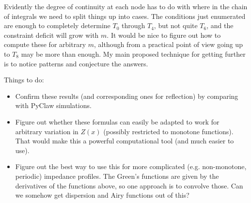 \documentclass[11pt]{article}
\begin{document}
Evidently the degree of continuity at each node has to do with where in the
chain of integrals we need to split things up into cases.
The conditions just enumerated are enough to completely determine $T_0$ through $T_4$,
but not quite $T_6$, and the constraint deficit will grow with $m$.  It would be nice
to figure out how to compute these for arbitrary $m$, although from a practical point
of view going up to $T_8$ may be more than enough.  My main proposed technique for
getting further is to notice patterns and conjecture the answers.

Things to do:
\begin{itemize}
    \item Confirm these results (and corresponding ones for reflection) by comparing with
            PyClaw simulations.
    \item Figure out whether these formulas can easily be adapted to work for arbitrary
            variation in $Z(x)$ (possibly restricted to monotone functions).
            That would make this a powerful computational tool (and much easier to use).
    \item Figure out the best way to use this for more complicated (e.g. non-monotone,
            periodic) impedance profiles.  The Green's functions are given by the 
            derivatives of the functions above, so one approach is to convolve those.
            Can we somehow get dispersion and Airy functions out of this?

\end{itemize}


%
%
\end{document}
